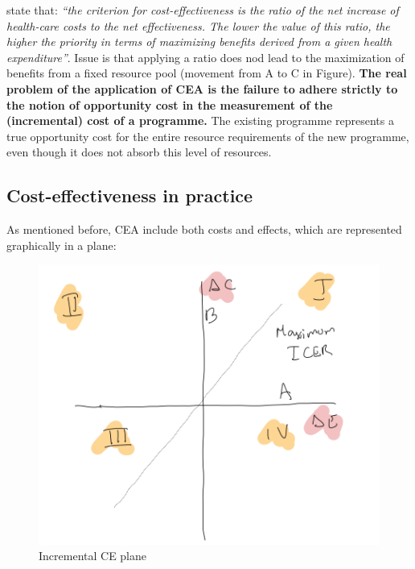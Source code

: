\documentclass[
]{book}
\begin{document}
\citet{weinstein1977foundations} state that: \emph{``the criterion for cost-effectiveness is the ratio of the net increase of health-care costs to the net effectiveness. The lower the value of this ratio, the higher the priority in terms of maximizing benefits derived from a given health expenditure''}. Issue is that applying a ratio does nod lead to the maximization of benefits from a fixed resource pool (movement from A to C in Figure). \textbf{The real problem of the application of CEA is the failure to adhere strictly to the notion of opportunity cost in the measurement of the (incremental) cost of a programme.} The existing programme represents a true opportunity cost for the entire resource requirements of the new programme, even though it does not absorb this level of resources.

\hypertarget{cost-effectiveness-in-practice}{%
\subsection{Cost-effectiveness in practice}\label{cost-effectiveness-in-practice}}

As mentioned before, CEA include both costs and effects, which are represented graphically in a plane:

\begin{figure}

{\centering \includegraphics[width=12.31in]{images/fig2} 

}

\caption{Incremental CE plane}\label{fig:fig2}
\end{figure}
\end{document}
